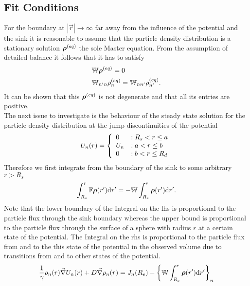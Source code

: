 \subsection{Fit Conditions}
\label{Fit_Conditions}
For the boundary at $|\vec{r}| \rightarrow \infty$ far away from the influence of the potential and the sink it is reasonable to assume that the particle density distribution is a stationary solution $\boldsymbol{\mathbf{\rho}}^{(eq)}$ the sole Master equation. From the assumption of detailed balance it follows that it has to satisfy
\begin{align}
    &\mathbb{W} \boldsymbol{\mathbf{\rho}}^{(eq)} = 0 \nonumber \\
    &\mathbb{W}_{n'n} \rho_n^{(eq)} = \mathbb{W}_{nn'}\rho_{n'}^{(eq)}.
    \label{detailed_balance2}
\end{align}
It can be shown that this $\boldsymbol{\mathbf{\rho}}^{(eq)}$ is not degenerate and that all its entries are positive. \\
The next issue to investigate is the behaviour of the steady state solution for the particle density distribution at the jump discontinuities of the potential 
\begin{equation}
  U_n(r) = \left\{ \begin{array}{l l} 
        0 &: R_s < r \le a \\
        U_n &: a<r \le b \\
        0 &: b < r \le R_d
    \end{array} \right.
    \label{step_potential}
\end{equation}
Therefore we first integrate from the boundary of the sink to some arbitrary $r > R_s$
\begin{equation*}
    \int_{R_s}^{r}\mathbb{F}\boldsymbol{\mathbf{\rho}}(r'){\rm d} r' = - \mathbb{W} \int_{R_s}^{r} \boldsymbol{\mathbf{\rho}}(r') {\rm d} r' .
\end{equation*}
Note that the lower boundary of the Integral on the lhs is proportional to the particle flux through the sink boundary whereas the upper bound is proportional to the particle flux through the surface of a sphere with radius $r$ at a certain state of the potential. The Integral on the rhs is proportional to the particle flux from and to the this state of the potential in the observed volume due to transitions from and to other states of the potential.\\
    \begin{equation}
        \frac{1}{\gamma}\rho_n(r) \vec{\nabla} U_n(r) + D \vec{\nabla} \rho_n(r) = J_n(R_s) - \left\{ \mathbb{W} \int_{R_s}^{r} \boldsymbol{\mathbf{\rho}}(r') {\rm d} r' \right\}_{n}
    \end{equation}
